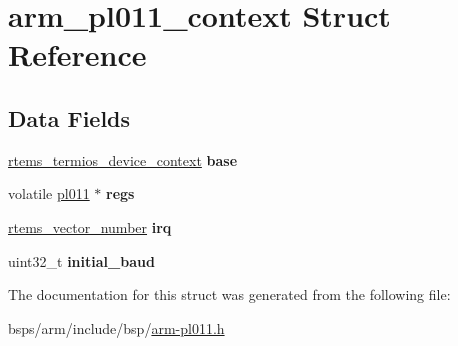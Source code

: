 \hypertarget{structarm__pl011__context}{}\section{arm\+\_\+pl011\+\_\+context Struct Reference}
\label{structarm__pl011__context}
\subsection*{Data Fields}
\begin{DoxyCompactItemize}
\item 
\mbox{\label{structarm__pl011__context_a7b77396d334943848ee9bb6402f4d51b}} 
\mbox{\hyperlink{structrtems__termios__device__context}{rtems\+\_\+termios\+\_\+device\+\_\+context}} {\bfseries base}
\item 
\mbox{\label{structarm__pl011__context_ae0d15949c261d03b8a44b1abe687f2ee}} 
volatile \mbox{\hyperlink{structpl011}{pl011}} $\ast$ {\bfseries regs}
\item 
\mbox{\label{structarm__pl011__context_a394b57e7848a36b6163b9f23794ad8ff}} 
\mbox{\hyperlink{group__ClassicINTR_ga3e434c197d99f128e78cae4d9358bd8b}{rtems\+\_\+vector\+\_\+number}} {\bfseries irq}
\item 
\mbox{\label{structarm__pl011__context_a2a9bb15ce40a2aa4e9f929f6b3b5ed1c}} 
uint32\+\_\+t {\bfseries initial\+\_\+baud}
\end{DoxyCompactItemize}


The documentation for this struct was generated from the following file\+:\begin{DoxyCompactItemize}
\item 
bsps/arm/include/bsp/\mbox{\hyperlink{arm-pl011_8h}{arm-\/pl011.\+h}}\end{DoxyCompactItemize}
